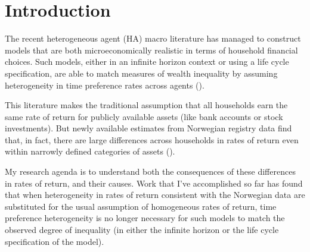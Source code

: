 \documentclass[\econtexRoot/Chp1proposal]{subfiles}
\begin{document}
\hypertarget{Introduction}{}
\section{Introduction}\notinsubfile{\label{sec:intro}}
\setcounter{page}{0}

\par The recent heterogeneous agent (HA) macro literature has managed to construct models that are both microeconomically realistic in terms of household financial choices. Such models, either in an infinite horizon context or using a life cycle specification, are able to match measures of wealth inequality by assuming heterogeneity in time preference rates across agents (\cite{cstw2017}).

\par This literature makes the traditional assumption that all households earn the same rate of return for publicly available assets (like bank accounts or stock investments). But newly available estimates from Norwegian registry data find that, in fact, there are large differences across households in rates of return even within narrowly defined categories of assets (\cite{aflgdmlp20}). %

\par My research agenda is to understand both the consequences of these differences in rates of return, and their causes. Work that I've accomplished so far has found that when heterogeneity in rates of return consistent with the Norwegian data are substituted for the usual assumption of homogeneous rates of return, time preference heterogeneity is no longer necessary for such models to match the observed degree of inequality (in either the infinite horizon or the life cycle specification of the model).


\onlyinsubfile{}

\end{document}
